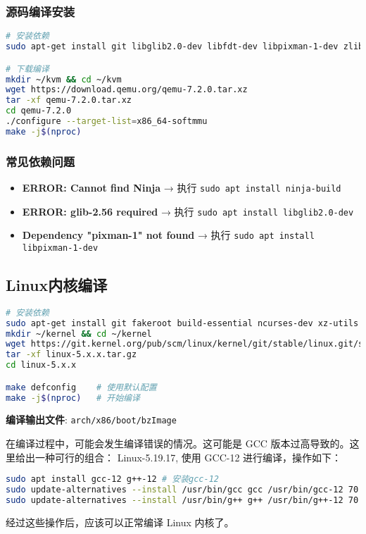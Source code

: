 \subsubsection{源码编译安装}
\begin{lstlisting}[language=bash]
# 安装依赖
sudo apt-get install git libglib2.0-dev libfdt-dev libpixman-1-dev zlib1g-dev ninja-build

# 下载编译
mkdir ~/kvm && cd ~/kvm
wget https://download.qemu.org/qemu-7.2.0.tar.xz
tar -xf qemu-7.2.0.tar.xz
cd qemu-7.2.0
./configure --target-list=x86_64-softmmu
make -j$(nproc)
\end{lstlisting}

\subsubsection{常见依赖问题}
\begin{itemize}
    \item \textbf{ERROR: Cannot find Ninja} → 执行 \texttt{sudo apt install ninja-build}
    \item \textbf{ERROR: glib-2.56 required} → 执行 \texttt{sudo apt install libglib2.0-dev}
    \item \textbf{Dependency "pixman-1" not found} → 执行 \texttt{sudo apt install libpixman-1-dev}
\end{itemize}

\subsection{Linux内核编译}
\begin{lstlisting}[language=bash]
# 安装依赖
sudo apt-get install git fakeroot build-essential ncurses-dev xz-utils libssl-dev bc flex libelf-dev bison
mkdir ~/kernel && cd ~/kernel
wget https://git.kernel.org/pub/scm/linux/kernel/git/stable/linux.git/snapshot/linux-5.x.x.tar.gz
tar -xf linux-5.x.x.tar.gz
cd linux-5.x.x

make defconfig    # 使用默认配置
make -j$(nproc)   # 开始编译
\end{lstlisting}

\textbf{编译输出文件}: \texttt{arch/x86/boot/bzImage}

在编译过程中，可能会发生编译错误的情况。这可能是 GCC 版本过高导致的。这里给出一种可行的组合： Linux-5.19.17, 使用 GCC-12 进行编译，操作如下：

\begin{lstlisting}[language=bash]
sudo apt install gcc-12 g++-12 # 安装gcc-12
sudo update-alternatives --install /usr/bin/gcc gcc /usr/bin/gcc-12 70
sudo update-alternatives --install /usr/bin/g++ g++ /usr/bin/g++-12 70 # 切换 gcc 默认版本
\end{lstlisting}
经过这些操作后，应该可以正常编译 Linux 内核了。

